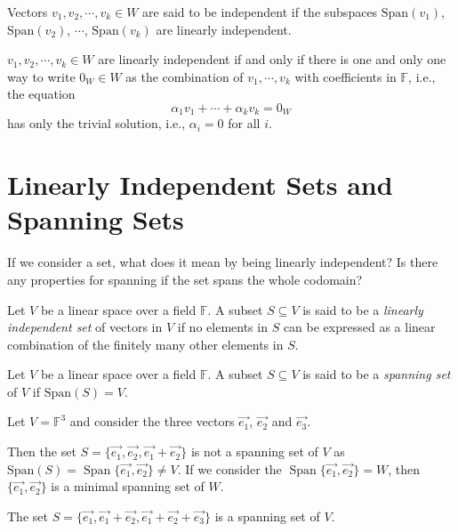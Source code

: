 \documentclass[
	11pt, %
	fleqn, %
	a4paper, %
]{LegrandOrangeBook}
\renewcommand{\span}[1]{\text{Span}(#1)} %
\newcommand{\F}{\mathbb{F}} %
\DeclareMathOperator{\Span}{Span}
\begin{document}
Vectors $v_1, v_2, \cdots, v_k \in W$ are said to be independent if the subspaces $\span{v_1}$, $\span{v_2}$, $\cdots$, $\span{v_k}$ are linearly independent.

\begin{proposition}
    $v_1, v_2, \cdots, v_k \in W$ are linearly independent if and only if there is one and only one way to write $0_W \in W$ as the combination of $v_1, \cdots, v_k$ with coefficients in $\F$, i.e., the equation 
    \[
        \alpha_1 v_1 + \cdots + \alpha_k v_k = 0_W
    \]
    has only  the trivial solution, i.e., $\alpha_i = 0$ for all $i$.
\end{proposition}

\newpage

\section{Linearly Independent Sets and Spanning Sets}

If we consider a set, what does it mean by being linearly independent? Is there any properties for spanning if the set spans the whole codomain?

\begin{definition}
    Let $V$ be a linear space over a field $\F$. A subset $S \subseteq V$ is said to be a \emph{linearly independent set} of vectors in $V$ if no elements in $S$ can be expressed as a linear combination of the finitely many other elements in $S$.
\end{definition}

\begin{definition}
    Let $V$ be a linear space over a field $\F$. A subset $S \subseteq V$ is said to be a \emph{spanning set} of $V$ if $\span{S} = V$.
\end{definition}

\begin{example}
    Let $V = \F^3$ and consider the three vectors $\vec{e_1}$, $\vec{e_2}$ and $\vec{e_3}$. 
    
    Then the set $S = \{\vec{e_1}, \vec{e_2}, \vec{e_1} + \vec{e_2}\}$ is not a spanning set of $V$ as $\span{S} = \Span \{\vec{e_1}, \vec{e_2}\} \neq V$. If we consider the $\Span \{\vec{e_1}, \vec{e_2}\} = W$, then $\{\vec{e_1}, \vec{e_2}\}$ is a minimal spanning set of $W$.

    The set $S = \{\vec{e_1}, \vec{e_1} + \vec{e_2}, \vec{e_1} + \vec{e_2} + \vec{e_3}\}$ is a spanning set of $V$.
\end{example}
\end{document}
